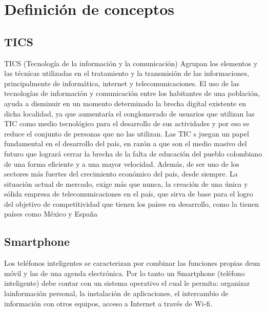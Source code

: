 
\section{Definición de conceptos}
	\subsection{TICS}
	TICS (Tecnología de la información y la comunicación) Agrupan los elementos y las técnicas utilizadas en el tratamiento y la transmisión de las informaciones, principalmente de informática, internet y telecomunicaciones. El uso de las tecnologías de información y comunicación entre los habitantes de una población, ayuda a disminuir en un momento determinado la brecha digital existente en dicha localidad, ya que aumentaría el conglomerado de usuarios que utilizan las TIC como medio tecnológico para el desarrollo de sus actividades y por eso se reduce el conjunto de personas que no las utilizan. Las TIC s juegan un papel fundamental en el desarrollo del país, en razón a que son el medio masivo del futuro que logrará cerrar la brecha de la falta de educación del pueblo colombiano de una forma eficiente y a una mayor velocidad. Además, de ser uno de los sectores más fuertes del crecimiento económico del país, desde siempre. La situación actual de mercado, exige más que nunca, la creación de una única y sólida empresa de telecomunicaciones en el país, que sirva de base para el logro del objetivo de competitividad que tienen los países en desarrollo, como la tienen países como México y España
	\subsection{Smartphone}
	Los teléfonos inteligentes se caracterizan por combinar las funciones propias deun móvil y las de una agenda electrónica. Por lo tanto un Smartphone (teléfono inteligente) debe contar con un sistema operativo el cual le permita: organizar lainformación personal, la instalación de aplicaciones, el intercambio de información con otros equipos, acceso a Internet a través de Wi-fi.
	
